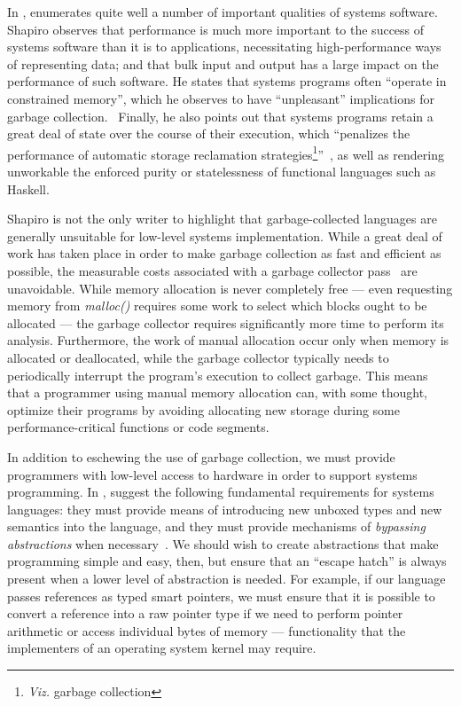 In , \citeauthor{Shapiro:2006:PLC:1215995.1216004} enumerates quite well a number of important qualities of systems software. Shapiro observes that performance is much more important to the success of systems software than it is to applications, necessitating high-performance ways of representing data; and that bulk input and output has a large impact on the performance of such software. He states that systems programs often ``operate in constrained memory'', which he observes to have ``unpleasant'' implications for garbage collection.~\cite[pp. 2]{Shapiro:2006:PLC:1215995.1216004} Finally, he also points out that systems programs retain a great deal of state over the course of their execution, which ``penalizes the performance of automatic storage reclamation strategies\footnote{\emph{Viz.} garbage collection}''~\cite[pp. 2]{Shapiro:2006:PLC:1215995.1216004}, as well as rendering unworkable the enforced purity or statelessness of functional languages such as Haskell.

Shapiro is not the only writer to highlight that garbage-collected languages are generally unsuitable for low-level systems implementation. While a great deal of work has taken place in order to make garbage collection as fast and efficient as possible, the measurable costs associated with a garbage collector pass~\cite{Hertz:2005:QPG:1094811.1094836} are unavoidable. While memory allocation is never completely free --- even requesting memory from \textit{malloc()} requires some work to select which blocks ought to be allocated --- the garbage collector requires significantly more time to perform its analysis. Furthermore, the work of manual allocation occur only when memory is allocated or deallocated, while the garbage collector typically needs to periodically interrupt the program's execution to collect garbage. This means that a programmer using manual memory allocation can, with some thought, optimize their programs by avoiding allocating new storage during some performance-critical functions or code segments.

In addition to eschewing the use of garbage collection, we must provide programmers with low-level access to hardware in order to support systems programming. In , \citeauthor{Frampton:2009:DMH:1508293.1508305} suggest the following fundamental requirements for systems languages: they must provide means of introducing new unboxed types and new semantics into the language, and they must provide mechanisms of \textit{bypassing abstractions} when necessary~\cite{Frampton:2009:DMH:1508293.1508305}. We should wish to create abstractions that make programming simple and easy, then, but ensure that an ``escape hatch'' is always present when a lower level of abstraction is needed. For example, if our language passes references as typed smart pointers, we must ensure that it is possible to convert a reference into a raw pointer type if we need to perform pointer arithmetic or access individual bytes of memory --- functionality that the implementers of an operating system kernel may require.

